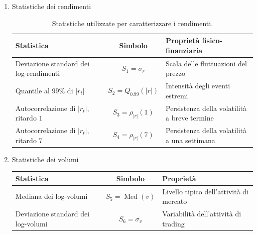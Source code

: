 \begin{enumerate}
    \item Statistiche dei rendimenti
        \begin{table}[h]
            \centering
            \small
            \renewcommand{\arraystretch}{1.35}
            \begin{tabularx}{\textwidth}{X c X}
            \toprule
            \textbf{Statistica} 
            & \textbf{Simbolo} 
            & \textbf{Proprietà fisico-finanziaria} \\
            \midrule

            Deviazione standard dei log-rendimenti
            & $S_1 = \sigma_r$
            & Scala delle fluttuazioni del prezzo \\

            Quantile al $99\%$ di $|r_t|$
            & $S_2 = Q_{0.99}(|r|)$
            & Intensità degli eventi estremi \\

            Autocorrelazione di $|r_t|$, ritardo $1$
            & $S_3 = \rho_{|r|}(1)$
            & Persistenza della volatilità a breve termine \\

            Autocorrelazione di $|r_t|$, ritardo $7$
            & $S_4 = \rho_{|r|}(7)$
            & Persistenza della volatilità a una settimana \\

            \bottomrule
            \end{tabularx}
            \caption{Statistiche utilizzate per caratterizzare i rendimenti.}
            \label{tab:statistiche-rendimenti}
        \end{table}
    \item Statistiche dei volumi
        \begin{table}[h]
            \centering
            \small
            \renewcommand{\arraystretch}{1.35}
            \begin{tabularx}{\textwidth}{X c X}
            \toprule
            \textbf{Statistica} 
            & \textbf{Simbolo} 
            & \textbf{Proprietà} \\
            \midrule

            Mediana dei log-volumi
            & $S_5 = \operatorname{Med}(v)$
            & Livello tipico dell'attività di mercato \\

            Deviazione standard dei log-volumi
            & $S_6 = \sigma_v$
            & Variabilità dell'attività di trading \\


\end{tabularx}
\end{table}
\end{enumerate}
